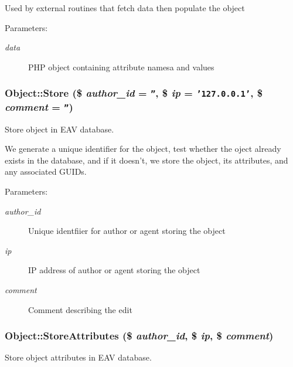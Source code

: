 Used by external routines that fetch data then populate the object

\begin{Desc}
\item[Parameters:]
\begin{description}
\item[{\em data}]PHP object containing attribute namesa and values \end{description}
\end{Desc}
\hypertarget{class_object_9a2ddfa89273d2f5e0d192b6c77d3d83}{
\subsubsection{\setlength{\rightskip}{0pt plus 5cm}Object::Store (\$ {\em author\_\-id} = {\tt ''}, \/  \$ {\em ip} = {\tt '127.0.0.1'}, \/  \$ {\em comment} = {\tt ''})}}
\label{class_object_9a2ddfa89273d2f5e0d192b6c77d3d83}


Store object in EAV database. 

We generate a unique identifier for the object, test whether the oject already exists in the database, and if it doesn't, we store the object, its attributes, and any associated GUIDs.

\begin{Desc}
\item[Parameters:]
\begin{description}
\item[{\em author\_\-id}]Unique identfiier for author or agent storing the object \item[{\em ip}]IP address of author or agent storing the object \item[{\em comment}]Comment describing the edit \end{description}
\end{Desc}
\hypertarget{class_object_bc9a36b7d0f2b7d5f6ac5467a244b7a0}{
\subsubsection{\setlength{\rightskip}{0pt plus 5cm}Object::StoreAttributes (\$ {\em author\_\-id}, \/  \$ {\em ip}, \/  \$ {\em comment})}}
\label{class_object_bc9a36b7d0f2b7d5f6ac5467a244b7a0}


Store object attributes in EAV database. 

